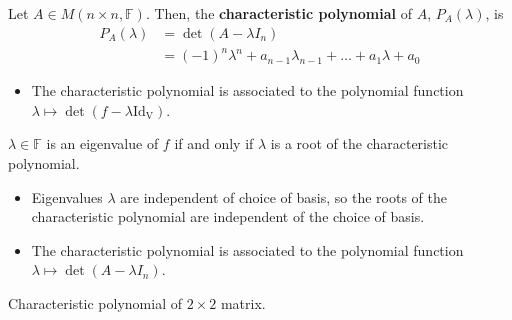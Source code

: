 \documentclass[letterpaper,12pt]{article}
\begin{document}
\begin{definition}
Let $A \in M(n \times n, \mathbb{F})$. Then, the \textbf{characteristic polynomial} of $A$, $P_{A}(\lambda)$, is
\begin{align*}
    P_{A}(\lambda) & = \det{(A - \lambda I_n)} \\
    & = (-1)^n \lambda^n + a_{n-1} \lambda_{n-1} + \dots + a_1 \lambda + a_0
\end{align*}
\begin{itemize}
    \item The characteristic polynomial is associated to the polynomial function $\lambda \longmapsto \det{(f - \lambda \operatorname{Id_{V}})}$.
\end{itemize}
\end{definition}

\begin{corollary}
$\lambda \in \mathbb{F}$ is an eigenvalue of $f$ if and only if $\lambda$ is a root of the characteristic polynomial.
\begin{itemize}
    \item Eigenvalues $\lambda$ are independent of choice of basis, so the roots of the characteristic polynomial are independent of the choice of basis.
    \item The characteristic polynomial is associated to the polynomial function $\lambda \longmapsto \det{(A - \lambda I_n)}$.
\end{itemize}
\end{corollary}

Characteristic polynomial of $2 \times 2$ matrix.
\end{document}
